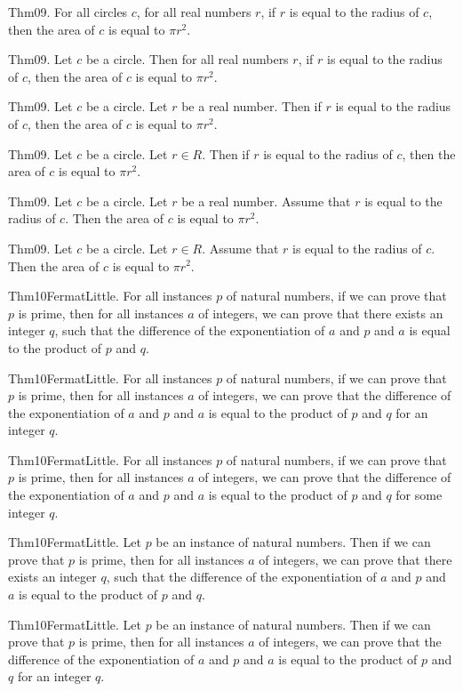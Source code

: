 \documentclass{article}
\begin{document}
Thm09. For all circles $c$, for all real numbers $r$, if $r$ is equal to the radius of $c$, then the area of $c$ is equal to $\pi r ^ {2}$.

Thm09. Let $c$ be a circle. Then for all real numbers $r$, if $r$ is equal to the radius of $c$, then the area of $c$ is equal to $\pi r ^ {2}$.

Thm09. Let $c$ be a circle. Let $r$ be a real number. Then if $r$ is equal to the radius of $c$, then the area of $c$ is equal to $\pi r ^ {2}$.

Thm09. Let $c$ be a circle. Let $r \in R$. Then if $r$ is equal to the radius of $c$, then the area of $c$ is equal to $\pi r ^ {2}$.

Thm09. Let $c$ be a circle. Let $r$ be a real number. Assume that $r$ is equal to the radius of $c$. Then the area of $c$ is equal to $\pi r ^ {2}$.

Thm09. Let $c$ be a circle. Let $r \in R$. Assume that $r$ is equal to the radius of $c$. Then the area of $c$ is equal to $\pi r ^ {2}$.

Thm10FermatLittle. For all instances $p$ of natural numbers, if we can prove that $p$ is prime, then for all instances $a$ of integers, we can prove that there exists an integer $q$, such that the difference of the exponentiation of $a$ and $p$ and $a$ is equal to the product of $p$ and $q$.

Thm10FermatLittle. For all instances $p$ of natural numbers, if we can prove that $p$ is prime, then for all instances $a$ of integers, we can prove that the difference of the exponentiation of $a$ and $p$ and $a$ is equal to the product of $p$ and $q$ for an integer $q$.

Thm10FermatLittle. For all instances $p$ of natural numbers, if we can prove that $p$ is prime, then for all instances $a$ of integers, we can prove that the difference of the exponentiation of $a$ and $p$ and $a$ is equal to the product of $p$ and $q$ for some integer $q$.

Thm10FermatLittle. Let $p$ be an instance of natural numbers. Then if we can prove that $p$ is prime, then for all instances $a$ of integers, we can prove that there exists an integer $q$, such that the difference of the exponentiation of $a$ and $p$ and $a$ is equal to the product of $p$ and $q$.

Thm10FermatLittle. Let $p$ be an instance of natural numbers. Then if we can prove that $p$ is prime, then for all instances $a$ of integers, we can prove that the difference of the exponentiation of $a$ and $p$ and $a$ is equal to the product of $p$ and $q$ for an integer $q$.
\end{document}
